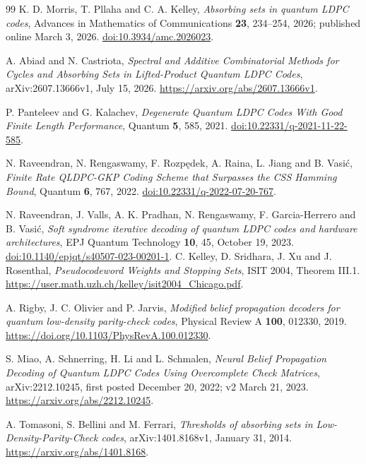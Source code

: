 \documentclass[11pt]{article}
\theoremstyle{definition}
\theoremstyle{remark}
\begin{document}
\begin{thebibliography}{99}
K. D. Morris, T. Pllaha and C. A. Kelley,
\emph{Absorbing sets in quantum LDPC codes},
Advances in Mathematics of Communications \textbf{23}, 234--254, 2026;
published online March 3, 2026.
\href{https://doi.org/10.3934/amc.2026023}{doi:10.3934/amc.2026023}.

A. Abiad and N. Castriota,
\emph{Spectral and Additive Combinatorial Methods for Cycles and Absorbing Sets in Lifted-Product Quantum LDPC Codes},
arXiv:2607.13666v1, July 15, 2026.
\url{https://arxiv.org/abs/2607.13666v1}.

P. Panteleev and G. Kalachev,
\emph{Degenerate Quantum LDPC Codes With Good Finite Length Performance},
Quantum \textbf{5}, 585, 2021.
\href{https://doi.org/10.22331/q-2021-11-22-585}{doi:10.22331/q-2021-11-22-585}.

N. Raveendran, N. Rengaswamy, F. Rozp\k{e}dek, A. Raina, L. Jiang and B. Vasi\'c,
\emph{Finite Rate QLDPC-GKP Coding Scheme that Surpasses the CSS Hamming Bound},
Quantum \textbf{6}, 767, 2022.
\href{https://doi.org/10.22331/q-2022-07-20-767}{doi:10.22331/q-2022-07-20-767}.

N. Raveendran, J. Valls, A. K. Pradhan, N. Rengaswamy, F. Garcia-Herrero and B. Vasi\'c,
\emph{Soft syndrome iterative decoding of quantum LDPC codes and hardware architectures},
EPJ Quantum Technology \textbf{10}, 45, October 19, 2023.
\href{https://doi.org/10.1140/epjqt/s40507-023-00201-1}{doi:10.1140/epjqt/s40507-023-00201-1}.
C. Kelley, D. Sridhara, J. Xu and J. Rosenthal,
\emph{Pseudocodeword Weights and Stopping Sets}, ISIT 2004, Theorem III.1.
\url{https://user.math.uzh.ch/kelley/isit2004_Chicago.pdf}.

A. Rigby, J. C. Olivier and P. Jarvis,
\emph{Modified belief propagation decoders for quantum low-density parity-check codes},
Physical Review A \textbf{100}, 012330, 2019.
\url{https://doi.org/10.1103/PhysRevA.100.012330}.

S. Miao, A. Schnerring, H. Li and L. Schmalen,
\emph{Neural Belief Propagation Decoding of Quantum LDPC Codes Using Overcomplete Check Matrices},
arXiv:2212.10245, first posted December 20, 2022; v2 March 21, 2023.
\url{https://arxiv.org/abs/2212.10245}.

A. Tomasoni, S. Bellini and M. Ferrari,
\emph{Thresholds of absorbing sets in Low-Density-Parity-Check codes},
arXiv:1401.8168v1, January 31, 2014.
\url{https://arxiv.org/abs/1401.8168}.
\end{thebibliography}
\end{document}
